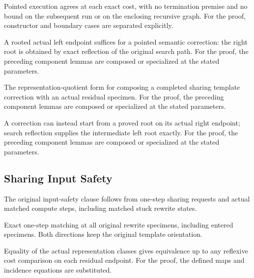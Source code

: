 Pointed execution agrees at each exact cost, with no termination premise and no bound on the subsequent run or on the enclosing recursive graph.
For the proof, constructor and boundary cases are separated explicitly.
\par{}

A rooted actual left endpoint suffices for a pointed semantic correction: the right root is obtained by exact reflection of the original search path.
For the proof, the preceding component lemmas are composed or specialized at the stated parameters.
\par{}

The representation-quotient form for composing a completed sharing template correction with an actual residual specimen.
For the proof, the preceding component lemmas are composed or specialized at the stated parameters.
\par{}

A correction can instead start from a proved root on its actual right endpoint; search reflection supplies the intermediate left root exactly.
For the proof, the preceding component lemmas are composed or specialized at the stated parameters.
\par{}

\subsection{Sharing Input Safety}
The original input-safety clause follows from one-step sharing requests and actual matched compute steps, including matched stuck rewrite states.

Exact one-step matching at all original rewrite specimens, including entered specimens. Both directions keep the original template orientation.
\par{}

Equality of the actual representation classes gives equivalence up to any reflexive cost comparison on each residual endpoint.
For the proof, the defined maps and incidence equations are substituted.
\par{}

